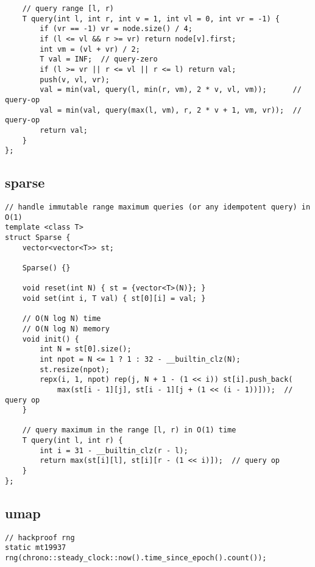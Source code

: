 \documentclass[twoside]{article}
\begin{document}
\begin{multicols*}{2}
\begin{verbatim}
    // query range [l, r)
    T query(int l, int r, int v = 1, int vl = 0, int vr = -1) {
        if (vr == -1) vr = node.size() / 4;
        if (l <= vl && r >= vr) return node[v].first;
        int vm = (vl + vr) / 2;
        T val = INF;  // query-zero
        if (l >= vr || r <= vl || r <= l) return val;
        push(v, vl, vr);
        val = min(val, query(l, min(r, vm), 2 * v, vl, vm));      // query-op
        val = min(val, query(max(l, vm), r, 2 * v + 1, vm, vr));  // query-op
        return val;
    }
};
\end{verbatim}

{
\subsection*{sparse}
}
\begin{verbatim}
// handle immutable range maximum queries (or any idempotent query) in O(1)
template <class T>
struct Sparse {
    vector<vector<T>> st;

    Sparse() {}

    void reset(int N) { st = {vector<T>(N)}; }
    void set(int i, T val) { st[0][i] = val; }

    // O(N log N) time
    // O(N log N) memory
    void init() {
        int N = st[0].size();
        int npot = N <= 1 ? 1 : 32 - __builtin_clz(N);
        st.resize(npot);
        repx(i, 1, npot) rep(j, N + 1 - (1 << i)) st[i].push_back(
            max(st[i - 1][j], st[i - 1][j + (1 << (i - 1))]));  // query op
    }

    // query maximum in the range [l, r) in O(1) time
    T query(int l, int r) {
        int i = 31 - __builtin_clz(r - l);
        return max(st[i][l], st[i][r - (1 << i)]);  // query op
    }
};
\end{verbatim}

{
\subsection*{umap}
}
\begin{verbatim}
// hackproof rng
static mt19937 rng(chrono::steady_clock::now().time_since_epoch().count());


\end{verbatim}
\end{multicols*}
\end{document}
